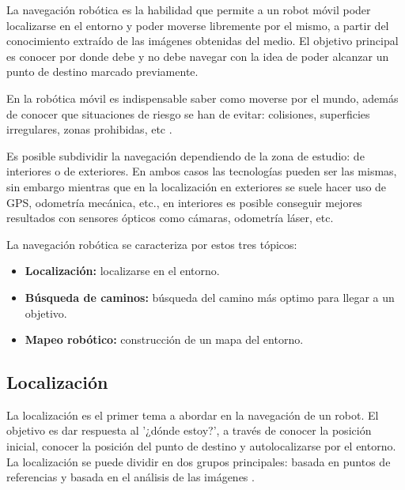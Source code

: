 
La navegación robótica es la habilidad que permite a un robot móvil poder
localizarse en el entorno y poder moverse libremente por el mismo, a partir del
conocimiento extraído de las imágenes obtenidas del medio. El objetivo principal
es conocer por donde debe y no debe navegar con la idea de poder alcanzar un
punto de destino marcado previamente. 

En la robótica móvil es indispensable saber como moverse por el mundo, además de
conocer que situaciones de riesgo se han de evitar: colisiones, superficies
irregulares, zonas prohibidas, etc \cite{NavegacionRobotica}. 

Es posible subdividir la navegación dependiendo de la zona de estudio: de
interiores o de exteriores. En ambos casos las tecnologías pueden ser las
mismas, sin embargo mientras que en la localización en exteriores se suele hacer
uso de GPS, odometría mecánica, etc., en interiores es posible conseguir mejores
resultados con sensores ópticos como cámaras, odometría láser, etc.

La navegación robótica se caracteriza por estos tres tópicos:

\begin{itemize}
  \item \textbf{Localización:} localizarse en el entorno. 
  \item \textbf{Búsqueda de caminos:} búsqueda del camino más optimo para llegar
  a un objetivo. 
  \item \textbf{Mapeo robótico:} construcción de un mapa del entorno. 
\end{itemize}%

\subsection{Localización}
La localización es el primer tema a abordar en la navegación de un robot. El
objetivo es dar respuesta al '¿dónde estoy?', a través de conocer la posición
inicial, conocer la posición del punto de destino y autolocalizarse por el
entorno. La localización se puede dividir en dos grupos principales: basada en
puntos de referencias y basada en el análisis de las imágenes
\cite{Localizacion}.

